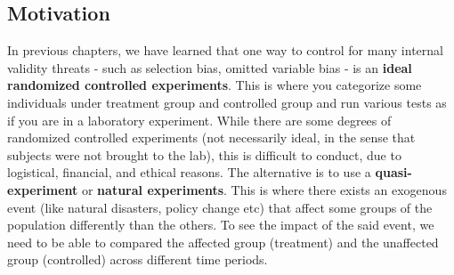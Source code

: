 \documentclass[12pt]{article}
\theoremstyle{definition}
\theoremstyle{property}
\theoremstyle{assumption}
\theoremstyle{example}
\theoremstyle{comment}
\begin{document}
\subsection{Motivation}
In previous chapters, we have learned that one way to control for many internal validity threats - such as selection bias, omitted variable bias - is an \textbf{ideal randomized controlled experiments}. This is where you categorize some individuals under treatment group and controlled group and run various tests as if you are in a laboratory experiment. While there are some degrees of randomized controlled experiments (not necessarily ideal, in the sense that subjects were not brought to the lab), this is difficult to conduct, due to logistical, financial, and ethical reasons. The alternative is to use a \textbf{quasi-experiment} or \textbf{natural experiments}. This is where there exists an exogenous event (like natural disasters, policy change etc) that affect some groups of the population differently than the others.  To see the impact of the said event, we need to be able to compared the affected group (treatment) and the unaffected group (controlled) across different time periods. \par\medskip
\end{document}
